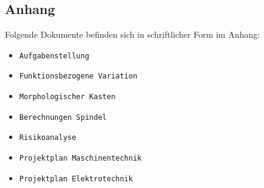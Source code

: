 \newpage
\begin{appendix}
\section{Anhang}
Folgende Dokumente befinden sich in schriftlicher Form im Anhang:

\begin{itemize}
	\item \verb|Aufgabenstellung|
	\item \verb|Funktionsbezogene Variation|
	\item \verb|Morphologischer Kasten|	
	\item \verb|Berechnungen Spindel|
	\item \verb|Risikoanalyse|
	\item \verb|Projektplan Maschinentechnik|
	\item \verb|Projektplan Elektrotechnik|	
	
	
\end{itemize}



\end{appendix}